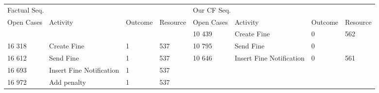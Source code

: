 \begin{tabular}{llllllll}
\toprule
\multicolumn{4}{l}{Factual Seq.} & \multicolumn{4}{l}{Our CF Seq.} \\
Open Cases & Activity & Outcome & Resource & Open Cases & Activity & Outcome & Resource \\
\midrule
 &  &  &  & 10 439 & Create Fine & 0 & 562 \\
16 318 & Create Fine & 1 & 537 & 10 795 & Send Fine & 0 &  \\
16 612 & Send Fine & 1 & 537 & 10 646 & Insert Fine Notification & 0 & 561 \\
16 693 & Insert Fine Notification & 1 & 537 &  &  &  &  \\
16 972 & Add penalty & 1 & 537 &  &  &  &  \\
\bottomrule
\end{tabular}
